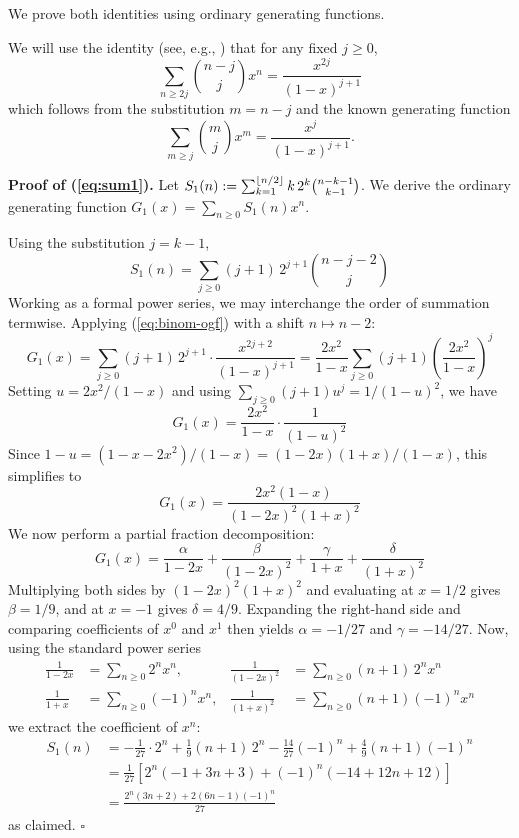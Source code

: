 \documentclass[referee,lineno,pdflatex,sn-mathphys-ay]{sn-jnl}
\DeclarePairedDelimiter\floor{\lfloor}{\rfloor}
\begin{document}
We prove both identities using ordinary generating functions.

We will use the identity (see, e.g., \citep[\S 1.2]{wilf2006}) that for any fixed $j \ge 0$,
\begin{equation}\label{eq:binom-ogf}
\sum_{n \ge 2j} \binom{n-j}{j} x^n = \frac{x^{2j}}{(1-x)^{j+1}}
\end{equation}
which follows from the substitution $m = n - j$ and the known generating function
\[
\sum_{m \ge j} \binom{m}{j} x^m = \frac{x^j}{(1-x)^{j+1}}.
\]

\textbf{Proof of (\ref{eq:sum1}).} Let $S_1(n) := \sum_{k=1}^{\floor{n/2}} k\, 2^k \binom{n-k-1}{k-1}$. We derive the ordinary generating function $G_1(x) = \sum_{n \ge 0} S_1(n) x^n$.

Using the substitution $j = k - 1$,
\[
S_1(n) = \sum_{j \ge 0} (j+1)\, 2^{j+1} \binom{n - j - 2}{j}
\]
Working as a formal power series, we may interchange the order of summation termwise. Applying (\ref{eq:binom-ogf}) with a shift $n \mapsto n - 2$:
\[
G_1(x) = \sum_{j \ge 0}(j+1)\, 2^{j+1} \cdot \frac{x^{2j+2}}{(1-x)^{j+1}}
= \frac{2x^2}{1-x} \sum_{j \ge 0} (j+1) \left( \frac{2x^2}{1-x} \right)^j
\]
Setting $u = 2x^2/(1-x)$ and using $\sum_{j \ge 0}(j+1) u^j = 1/(1-u)^2$, we have
\[
G_1(x) = \frac{2x^2}{1-x} \cdot \frac{1}{(1-u)^2}
\]
Since $1 - u = (1 - x - 2x^2)/(1-x) = (1-2x)(1+x)/(1-x)$, this simplifies to
\[
G_1(x) = \frac{2x^2(1-x)}{(1-2x)^2(1+x)^2}
\]
We now perform a partial fraction decomposition:
\[
G_1(x) = \frac{\alpha}{1-2x} + \frac{\beta}{(1-2x)^2} + \frac{\gamma}{1+x} + \frac{\delta}{(1+x)^2}
\]
Multiplying both sides by $(1-2x)^2(1+x)^2$ and evaluating at $x = 1/2$ gives $\beta = 1/9$, and at $x = -1$ gives $\delta = 4/9$. Expanding the right-hand side and comparing coefficients of $x^0$ and $x^1$ then yields $\alpha = -1/27$ and $\gamma = -14/27$. Now, using the standard power series
\begin{align*}
\frac{1}{1-2x} &= \sum_{n \ge 0} 2^n x^n, &
\frac{1}{(1-2x)^2} &= \sum_{n \ge 0} (n+1)\, 2^n x^n \\
\frac{1}{1+x} &= \sum_{n \ge 0} (-1)^n x^n, &
\frac{1}{(1+x)^2} &= \sum_{n \ge 0} (n+1)(-1)^n x^n
\end{align*}
we extract the coefficient of $x^n$:
\begin{align*}
S_1(n) &= -\frac{1}{27} \cdot 2^n + \frac{1}{9}(n+1)\, 2^n - \frac{14}{27}(-1)^n + \frac{4}{9}(n+1)(-1)^n \\
&= \frac{1}{27}\left[ 2^n(-1 + 3n + 3) + (-1)^n(-14 + 12n + 12) \right] \\
&= \frac{2^n(3n+2) + 2(6n-1)(-1)^n}{27}
\end{align*}
as claimed. $\square$
\end{document}
